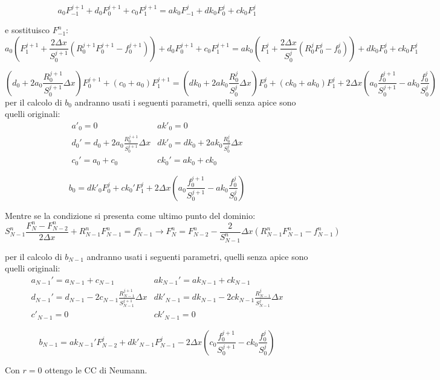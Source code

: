 \documentclass[]{article}
\newcommand{\lr}[3]{\ensuremath{\left#1 #3 \right#2}}
\newcommand{\lrt}[1]{\lr{(}{)}{#1}}
\numberwithin{equation}{subsection}
\begin{document}
$$
a_0  F_{-1}^{j+1} + d_0 F_{0}^{j+1} + c_{0}F_{1}^{j+1} = 
ak_0 F_{-1}^{j}   + dk_0 F_{0}^{j}  + ck_0 F_{1}^{j}
$$

e sostituisco $F_{-1}^{n}$:
$$
a_0 \lrt{ F_{1}^{j+1} + \frac {2 \Delta x}{S_0^{j+1}} \lrt{R_0^{j+1}F_{0}^{j+1}-f^{j+1}_0}} +d_0 F_{0}^{j+1} +c_{0}F_{1}^{j+1} = 
ak_0 \lrt{F_{1}^{j} + \frac {2 \Delta x}{S_0^{j}} \lrt{R_0^jF_{0}^{j}-f^{j}_0}} + dk_0 F_{0}^{j} + ck_0 F_{1}^{j}
$$

$$
\lrt{d_0 + 2 a_0 \frac{R_0^{j+1}}{S_0^{j+1}}\Delta x} F_0^{j+1} + \lrt{c_0+a_0}F^{j+1}_1 = 
\lrt{dk_0 + 2 ak_0 \frac{R_0^{j}}{S_0^{j}}\Delta x} F_0^{j} + \lrt{ck_0+ak_0}F^{j}_1 + 
2 \Delta x \lrt{a_0 \frac{f^{j+1}_0}{S^{j+1}_0}-ak_0\frac{f^j_0}{S^{j}_0}}
$$
per il calcolo di $b_0$ andranno usati i seguenti parametri, quelli senza apice sono quelli originali:
$$
\begin{array}{ll}
a'_0 = 0 & ak'_0= 0\\
d_0' = d_0 + 2 a_0 \frac{R_0^{j+1}}{S_0^{j+1}}\Delta x& dk'_0 = dk_0 + 2 ak_0 \frac{R_0^{j}}{S_0^{j}}\Delta x\\
c_0' = a_0+c_0 & ck_0' = ak_0+ck_0
\end{array}
$$

$$b_0 = dk'_0 F_0^j  + ck_0' F_1^j + 2 \Delta x \lrt{a_0 \frac{f^{j+1}_0}{S^{j+1}_0}-ak_0\frac{f^j_0}{S^{j}_0}}$$

Mentre se la condizione si presenta come ultimo punto del dominio:
$$S_{N-1}^n\frac{F_{N}^{n}-F_{N-2}^{n}}{2\Delta x} + R_{N-1}^nF_{N-1}^{n} = f_{N-1}^n  \to 
F_{N}^{n} = F_{N-2}^{n} - \frac 2{S_{N-1}^n}\Delta x \lrt{R_{N-1}^nF_{N-1}^{n}-f^n_{N-1}}$$

per il calcolo di $b_{N-1}$ andranno usati i seguenti parametri, quelli senza apice sono quelli originali:
$$
\begin{array}{ll}
a_{N-1}' = a_{N-1}+c_{N-1} & ak_{N-1}' = ak_{N-1}+ck_{N-1}\\
d_{N-1}' = d_{N-1} - 2 c_{N-1} \frac{R_{N-1}^{j+1}}{S_{N-1}^{j+1}}\Delta x& dk'_{N-1} = dk_{N-1} - 2 ck_{N-1} \frac{R_{N-1}^{j}}{S_{N-1}^{j}}\Delta x\\
c'_{N-1} = 0 & ck'_{N-1}= 0
\end{array}
$$

$$b_{N-1} = ak_{N-1}' F_{N-2}^j + dk'_{N-1} F_{N-1}^j - 2 \Delta x \lrt{c_0 \frac{f^{j+1}_0}{S^{j+1}_0}-ck_0\frac{f^j_0}{S^{j}_0}}$$

Con $r=0$ ottengo le CC di Neumann.
\end{document}
